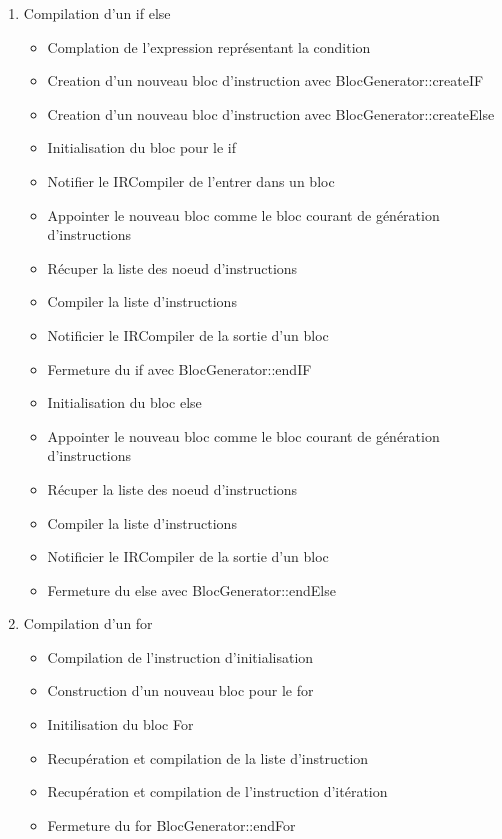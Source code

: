 \documentclass{article}
\begin{document}
\begin{enumerate}
   \item Compilation d'un if else
     \begin{itemize}
       \item Complation de l'expression représentant la condition
       \item Creation d'un nouveau bloc d'instruction avec BlocGenerator::createIF
       \item Creation d'un nouveau bloc d'instruction avec BlocGenerator::createElse
       \item Initialisation du bloc pour le if
       \item Notifier le IRCompiler de l'entrer dans un bloc
       \item Appointer le nouveau bloc comme le bloc courant de génération d'instructions
       \item Récuper la liste des noeud d'instructions
       \item Compiler la liste d'instructions
       \item Notificier le IRCompiler de la sortie d'un bloc
       \item Fermeture du if avec BlocGenerator::endIF
       \item Initialisation du bloc else
       \item Appointer le nouveau bloc comme le bloc courant de génération d'instructions
       \item Récuper la liste des noeud d'instructions
       \item Compiler la liste d'instructions
       \item Notificier le IRCompiler de la sortie d'un bloc
       \item Fermeture du else avec BlocGenerator::endElse
     \end{itemize}

   \item Compilation d'un for
     \begin{itemize} 
       \item Compilation de l'instruction d'initialisation
       \item Construction d'un nouveau bloc pour le for
       \item Initilisation du bloc For
       \item Recupération et compilation de la liste d'instruction
       \item Recupération et compilation de l'instruction d'itération
       \item Fermeture du for BlocGenerator::endFor
     \end{itemize}


\end{enumerate}
\end{document}
